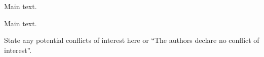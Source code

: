 \documentclass[journal,article,accept,moreauthors,pdftex,12pt,a4paper]{mdpi}
\begin{document}






Main text.



Main text.



State any potential conflicts of interest here or ``The authors declare no conflict of interest''. 


\makeatletter
\renewcommand\@biblabel[1]{#1. }
\makeatother
\end{document}
